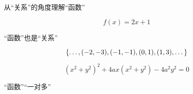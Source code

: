 
\begin{frame}{}
\end{frame}

\begin{frame}{}
  \begin{center}
    从``关系''的角度理解``函数''
  \end{center}

\end{frame}

\begin{frame}{}
  \[
    f(x) = 2x + 1
  \]
  \begin{center}
    ``函数''也是``关系''
  \end{center}
  \[
    \{\dots, (-2, -3), (-1, -1), (0, 1), (1, 3), \dots\}
  \]
\end{frame}

\begin{frame}{}
  \[
    (x^2 + y^2)^2 + 4 a x (x^2 + y^2) - 4a^2 y^2 = 0
  \]


  \begin{center}
    ``函数''``一对多''
  \end{center}
\end{frame}

\begin{frame}{}
  \begin{center}

    \pause

    \begin{center}
    \end{center}
  \end{center}
\end{frame}
